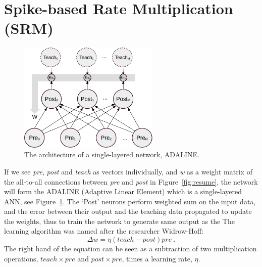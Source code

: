 \section{Spike-based Rate Multiplication (SRM)}
\label{sec:SRM}
\begin{figure}
	\centering
	\includegraphics[width=0.6\textwidth]{pics_sdlm/adaline.pdf}
	\caption{The architecture of a single-layered network, ADALINE.}
	\label{fig:adaline}
\end{figure}
If we see \textit{pre}, \textit{post} and \textit{teach} as vectors individually, and \textit{w} as a weight matrix of the all-to-all connections between \textit{pre} and \textit{post} in Figure~\ref{fig:resume}, the network will form the ADALINE (Adaptive Linear Element) which is a single-layered ANN, see Figure~\ref{fig:adaline}.
The `Post' neurons perform \protect{} weighted sum on the input data, and the error between their output and the teaching data \protect{} \protect{} propagated to update the weights, thus to train the network to generate \protect{} same output as the \protect{} \protect{} 
The learning algorithm was named after the researcher Widrow-Hoff:
\begin{equation}
\Delta w = \eta (teach - post)pre~.
\label{equ:widrow-hoff}
\end{equation}
The right hand \protect{} of the equation can be seen as a subtraction of two multiplication operations, $teach \times pre$ and $post \times pre$, times a learning rate, $\eta$.

